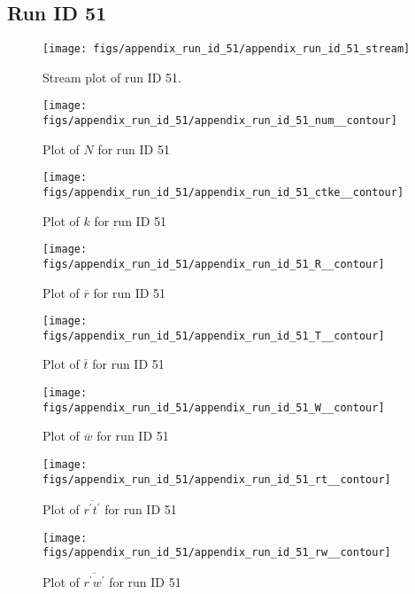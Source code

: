 \subsection{Run ID 51}
\begin{figure}[H]
\centering
\texttt{[image: figs/appendix\_run\_id\_51/appendix\_run\_id\_51\_stream]}
\caption{Stream plot of run ID 51.}
\label{fig:appendix_run_id_51_stream}
\end{figure}


\begin{figure}[H]
\centering
\texttt{[image: figs/appendix\_run\_id\_51/appendix\_run\_id\_51\_num\_\_contour]}
\caption{Plot of $N$ for run ID 51}
\label{fig:appendix_run_id_51_num__contour}
\end{figure}


\begin{figure}[H]
\centering
\texttt{[image: figs/appendix\_run\_id\_51/appendix\_run\_id\_51\_ctke\_\_contour]}
\caption{Plot of $k$ for run ID 51}
\label{fig:appendix_run_id_51_ctke__contour}
\end{figure}


\begin{figure}[H]
\centering
\texttt{[image: figs/appendix\_run\_id\_51/appendix\_run\_id\_51\_R\_\_contour]}
\caption{Plot of $\overline{r}$ for run ID 51}
\label{fig:appendix_run_id_51_R__contour}
\end{figure}


\begin{figure}[H]
\centering
\texttt{[image: figs/appendix\_run\_id\_51/appendix\_run\_id\_51\_T\_\_contour]}
\caption{Plot of $\overline{t}$ for run ID 51}
\label{fig:appendix_run_id_51_T__contour}
\end{figure}


\begin{figure}[H]
\centering
\texttt{[image: figs/appendix\_run\_id\_51/appendix\_run\_id\_51\_W\_\_contour]}
\caption{Plot of $\overline{w}$ for run ID 51}
\label{fig:appendix_run_id_51_W__contour}
\end{figure}


\begin{figure}[H]
\centering
\texttt{[image: figs/appendix\_run\_id\_51/appendix\_run\_id\_51\_rt\_\_contour]}
\caption{Plot of $\overline{r^\prime t^\prime}$ for run ID 51}
\label{fig:appendix_run_id_51_rt__contour}
\end{figure}


\begin{figure}[H]
\centering
\texttt{[image: figs/appendix\_run\_id\_51/appendix\_run\_id\_51\_rw\_\_contour]}
\caption{Plot of $\overline{r^\prime w^\prime}$ for run ID 51}
\label{fig:appendix_run_id_51_rw__contour}
\end{figure}


